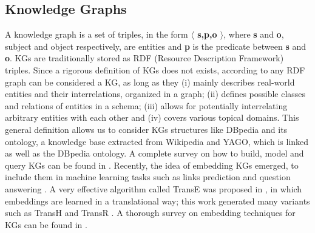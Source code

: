 \subsection{Knowledge Graphs}
A knowledge graph is a set of triples, in the form \textbf{$\langle$ s,p,o $\rangle$}, where \textbf{s} and \textbf{o}, subject and object respectively, are entities and \textbf{p} is the predicate between \textbf{s} and \textbf{o}. KGs are traditionally stored as RDF (Resource Description Framework) \cite{colazzo2014rdf} triples. Since a rigorous definition of KGs does not exists, according to \cite{paulheim2017knowledge} any RDF graph can be considered a KG, as long as they (i) mainly describes real-world entities and their interrelations, organized in a graph; (ii) defines possible classes and relations of entities in a schema; (iii) allows for potentially interrelating arbitrary entities with each other and (iv) covers various topical domains. This general definition allows us to consider KGs structures like DBpedia \cite{lehmann2015dbpedia} and its ontology, a knowledge base extracted from Wikipedia and YAGO, \cite{suchanek2007yago} which is linked as well as the DBpedia ontology. A complete survey on how to build, model and query KGs can be found in \cite{ji2020survey}.
Recently, the idea of embedding KGs emerged, to include them in machine learning tasks such as links prediction \cite{rossi2020knowledge} and question answering \cite{huang2019knowledge}. A very effective algorithm called TransE was proposed in \cite{bordes2013translating}, in which embeddings are learned in a translational way; this work generated many variants such as TransH \cite{wang2014knowledge} and TransR \cite{lin2015learning}. A thorough survey on embedding techniques for KGs can be found in \cite{goyal2018graph}.



